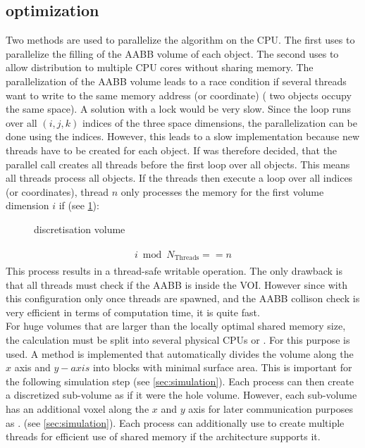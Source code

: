 \subsection{optimization}
% 
Two methods are used to parallelize the algorithm on the \ac{CPU}.
The first uses \openmp{} to parallelize the filling of the \ac{AABB} volume of each object.
The second uses \mpi{} to allow distribution to multiple \ac{CPU} cores without sharing memory. 
% 
The parallelization of the \ac{AABB} volume leads to a race condition if several threads want to write to the same memory address (or coordinate) (\eg{} two objects occupy the same space).
A solution with a lock would be very slow.
Since the loop runs over all $(i,j,k)$ indices of the three space dimensions, the parallelization can be done using the indices.
However, this leads to a slow implementation because new threads have to be created for each object.
If was therefore decided, that the parallel call creates all threads before the first loop over all objects.
This means all threads process all objects.
If the threads then execute a loop over all indices (or coordinates), thread $n$ only processes the memory for the first volume dimension $i$ if (see \cref{fig:discVolThread}):
% 
\begin{figure}[!t]
\centering
\setlength{\tikzwidth}{0.5\textwidth}
\caption{discretisation volume}
\label{fig:discVolThread}
\end{figure}
% 
\begin{align}
\begin{split}
    i \bmod N_{\text{Threads}} == n
\end{split}
\end{align}
% 
This process results in a thread-safe writable operation.
The only drawback is that all threads must check if the \ac{AABB} is inside the \ac{VOI}.
However since with this configuration only once threads are spawned, and the \ac{AABB} collison check is very efficient in terms of computation time, it is quite fast.
\\
% 
For huge volumes that are larger than the locally optimal shared memory size, the calculation must be split into several physical \acp{CPU} or .
For this purpose \mpi{} is used.
A method is implemented that automatically divides the volume along the $x$ axis and $y- axis$ into blocks with minimal surface area.
This is important for the following simulation step (see \cref{sec:simulation}).
Each \mpi{} process can then create a discretized sub-volume as if it were the hole volume.
However, each sub-volume has an additional voxel along the $x$ and $y$ axis for later communication purposes as . (see \cref{sec:simulation}).
Each \mpi{} process can additionally use \openmp{} to create multiple threads for efficient use of shared memory if the architecture supports it.
% 
% 
% 

